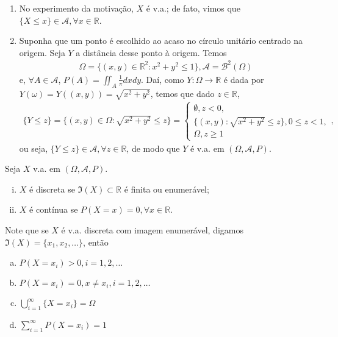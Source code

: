 \documentclass[../Notas.tex]{subfiles}
\begin{document}
\begin{examples}
\begin{enumerate}
    \item No experimento da motivação, $X$ é v.a.; de fato, vimos que $\{X\leq x\} \in\mathcal{A}, \forall x\in\mathbb{R}$.
    \item Suponha que um ponto é escolhido ao acaso no círculo unitário centrado na origem. Seja $Y$ a distância desse ponto à origem. Temos
    \begin{align*}
        \Omega = \{ (x,y)\in\mathbb{R}^2 : x^2 + y^2 \leq 1 \}, \mathcal{A} = \mathcal{B}^2(\Omega)
    \end{align*}
    e, $\forall A\in\mathcal{A}$, $\displaystyle{ P(A) = \iint_A \frac{1}{\pi}dxdy }$. Daí, como $Y:\Omega\to\mathbb{R}$ é dada por $Y(\omega) = Y((x,y)) = \sqrt{x^2 + y^2}$, temos que dado $z\in\mathbb{R}$,
    \begin{align*}
        \{ Y\leq z \} = \{ (x,y)\in\Omega : \sqrt{x^2 + y^2} \leq z \} = \begin{cases}
        \emptyset, z < 0, \\
        \{ (x,y) : \sqrt{x^2 + y^2} \leq z \}, 0\leq z < 1, \\
        \Omega, z\geq 1
        \end{cases},
    \end{align*}
    ou seja, $\{Y\leq z\}\in\mathcal{A}, \forall z\in\mathbb{R}$, de modo que $Y$ é v.a. em $(\Omega, \mathcal{A}, P)$.
\end{enumerate}
\end{examples}

\begin{definition}
Seja $X$ v.a. em $(\Omega, \mathcal{A}, P)$.
\begin{enumerate}[(i)]
    \item $X$ é discreta se $\Im(X)\subset\mathbb{R}$ é finita ou enumerável;
    \item $X$ é contínua se $P(X=x) = 0, \forall x\in\mathbb{R}$.
\end{enumerate}
\end{definition}
Note que se $X$ é v.a. discreta com imagem enumerável, digamos $\Im(X) = \{ x_1, x_2, \dots \}$, então
\begin{enumerate}[(a)]
    \item $P(X = x_i) > 0, i = 1, 2, \dots$
    \item $P(X = x_i) = 0, x\neq x_i, i = 1, 2, \dots$
    \item $\displaystyle{ \bigcup_{i=1}^{\infty} \{X = x_i\} = \Omega}$
    \item $\displaystyle{ \sum_{i=1}^{\infty}P(X = x_i) = 1 }$
\end{enumerate}
\end{document}
